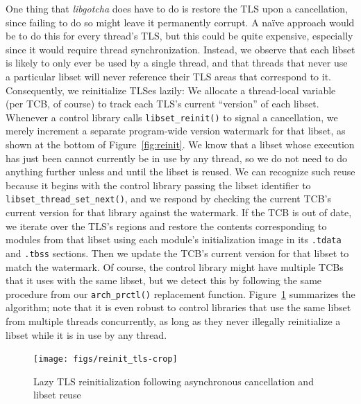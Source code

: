 One thing that \textit{libgotcha} does have to do is restore the TLS upon a
cancellation, since failing to do so might leave it permanently corrupt.  A na\"ive
approach would be to do this for every thread's TLS, but this could be quite
expensive, especially since it would require thread synchronization.  Instead, we
observe that each libset is likely to only ever be used by a single thread, and that
threads that never use a particular libset will never reference their TLS areas that
correspond to it.  Consequently, we reinitialize TLSes lazily:
We allocate a thread-local variable (per TCB, of course) to track each TLS's current
``version'' of each libset.  Whenever a control library calls
\texttt{libset\_reinit()} to signal a cancellation, we merely increment a separate
program-wide version watermark for that libset, as shown at the bottom of
Figure~\ref{fig:reinit}.  We know that a libset whose execution has just been
 cannot currently be in use by any thread, so we do not need to do
anything
further unless and until the libset is reused.  We can recognize such reuse because
it begins with the control library passing the libset identifier to
\texttt{libset\_thread\_set\_next()}, and we respond by checking the current TCB's
current version for that library against the watermark.  If the TCB is out of date,
we iterate over the TLS's regions and restore the contents corresponding to modules
from that libset using each module's initialization image in its \texttt{.tdata}
and \texttt{.tbss} sections.  Then we update the TCB's current version for that
libset to match the watermark.  Of course, the control library might have multiple
TCBs that it uses with the same libset, but we detect this by following the same
procedure from our \texttt{arch\_prctl()} replacement function.
Figure~\ref{fig:tlsreinit} summarizes the algorithm; note that it is even robust to
control libraries that use the same libset from multiple threads concurrently, as
long as they never illegally reinitialize a libset while it is in use by any thread.

\begin{figure}
\texttt{[image: figs/reinit\_tls-crop]}
\caption{Lazy TLS reinitialization following asynchronous cancellation and libset reuse}
\label{fig:tlsreinit}
\end{figure}

